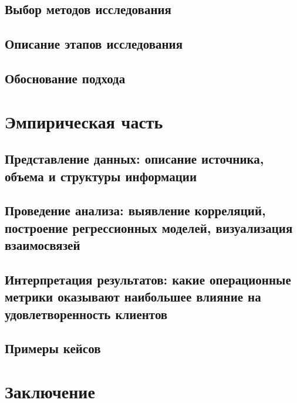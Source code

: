 \documentclass[12pt]{article}
\begin{document}
\subsection{Выбор методов исследования}
\vspace{0.5em}

\subsection{Описание этапов исследования}
\vspace{0.5em}

\subsection{Обоснование подхода}
\vspace{0.5em}

\newpage
\section{Эмпирическая часть}

\subsection{Представление данных: описание источника, объема и структуры информации}
\vspace{0.5em}

\subsection{Проведение анализа: выявление корреляций, построение регрессионных моделей, визуализация взаимосвязей}
\vspace{0.5em}

\subsection{Интерпретация результатов: какие операционные метрики оказывают наибольшее влияние на удовлетворенность клиентов}
\vspace{0.5em}

\subsection{Примеры кейсов}
\vspace{0.5em}

\newpage
\section{Заключение}
\end{document}
